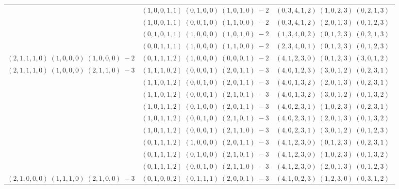 \documentclass[11pt]{article}
\begin{document}
\begin{longtable}[l]{|c|c|c|}
 \cline{2-3} 
 & $(1 ,0 ,0 ,1 ,1) \;(0 ,1 ,0 ,0) \;(1 ,0 ,1 ,0) \;-2$ & $(0 ,3 ,4 ,1 ,2) \;(1 ,0 ,2 ,3) \;(0 ,2 ,1 ,3) \;$\\ 
 \cline{2-3} 
 & $(1 ,0 ,0 ,1 ,1) \;(0 ,0 ,1 ,0) \;(1 ,1 ,0 ,0) \;-2$ & $(0 ,3 ,4 ,1 ,2) \;(2 ,0 ,1 ,3) \;(0 ,1 ,2 ,3) \;$\\ 
 \cline{2-3} 
 & $(0 ,1 ,0 ,1 ,1) \;(1 ,0 ,0 ,0) \;(1 ,0 ,1 ,0) \;-2$ & $(1 ,3 ,4 ,0 ,2) \;(0 ,1 ,2 ,3) \;(0 ,2 ,1 ,3) \;$\\ 
 \cline{2-3} 
 & $(0 ,0 ,1 ,1 ,1) \;(1 ,0 ,0 ,0) \;(1 ,1 ,0 ,0) \;-2$ & $(2 ,3 ,4 ,0 ,1) \;(0 ,1 ,2 ,3) \;(0 ,1 ,2 ,3) \;$\\ \hline\multirow[t]{1}{*}{ $(2 ,1 ,1 ,1 ,0) \;(1 ,0 ,0 ,0) \;(1 ,0 ,0 ,0) \;-2$ }  & $(0 ,1 ,1 ,1 ,2) \;(1 ,0 ,0 ,0) \;(0 ,0 ,0 ,1) \;-2$ & $(4 ,1 ,2 ,3 ,0) \;(0 ,1 ,2 ,3) \;(3 ,0 ,1 ,2) \;$\\ \hline\multirow[t]{9}{*}{ $(2 ,1 ,1 ,1 ,0) \;(1 ,0 ,0 ,0) \;(2 ,1 ,1 ,0) \;-3$ }  & $(1 ,1 ,1 ,0 ,2) \;(0 ,0 ,0 ,1) \;(2 ,0 ,1 ,1) \;-3$ & $(4 ,0 ,1 ,2 ,3) \;(3 ,0 ,1 ,2) \;(0 ,2 ,3 ,1) \;$\\ 
 \cline{2-3} 
 & $(1 ,1 ,0 ,1 ,2) \;(0 ,0 ,1 ,0) \;(2 ,0 ,1 ,1) \;-3$ & $(4 ,0 ,1 ,3 ,2) \;(2 ,0 ,1 ,3) \;(0 ,2 ,3 ,1) \;$\\ 
 \cline{2-3} 
 & $(1 ,1 ,0 ,1 ,2) \;(0 ,0 ,0 ,1) \;(2 ,1 ,0 ,1) \;-3$ & $(4 ,0 ,1 ,3 ,2) \;(3 ,0 ,1 ,2) \;(0 ,1 ,3 ,2) \;$\\ 
 \cline{2-3} 
 & $(1 ,0 ,1 ,1 ,2) \;(0 ,1 ,0 ,0) \;(2 ,0 ,1 ,1) \;-3$ & $(4 ,0 ,2 ,3 ,1) \;(1 ,0 ,2 ,3) \;(0 ,2 ,3 ,1) \;$\\ 
 \cline{2-3} 
 & $(1 ,0 ,1 ,1 ,2) \;(0 ,0 ,1 ,0) \;(2 ,1 ,0 ,1) \;-3$ & $(4 ,0 ,2 ,3 ,1) \;(2 ,0 ,1 ,3) \;(0 ,1 ,3 ,2) \;$\\ 
 \cline{2-3} 
 & $(1 ,0 ,1 ,1 ,2) \;(0 ,0 ,0 ,1) \;(2 ,1 ,1 ,0) \;-3$ & $(4 ,0 ,2 ,3 ,1) \;(3 ,0 ,1 ,2) \;(0 ,1 ,2 ,3) \;$\\ 
 \cline{2-3} 
 & $(0 ,1 ,1 ,1 ,2) \;(1 ,0 ,0 ,0) \;(2 ,0 ,1 ,1) \;-3$ & $(4 ,1 ,2 ,3 ,0) \;(0 ,1 ,2 ,3) \;(0 ,2 ,3 ,1) \;$\\ 
 \cline{2-3} 
 & $(0 ,1 ,1 ,1 ,2) \;(0 ,1 ,0 ,0) \;(2 ,1 ,0 ,1) \;-3$ & $(4 ,1 ,2 ,3 ,0) \;(1 ,0 ,2 ,3) \;(0 ,1 ,3 ,2) \;$\\ 
 \cline{2-3} 
 & $(0 ,1 ,1 ,1 ,2) \;(0 ,0 ,1 ,0) \;(2 ,1 ,1 ,0) \;-3$ & $(4 ,1 ,2 ,3 ,0) \;(2 ,0 ,1 ,3) \;(0 ,1 ,2 ,3) \;$\\ \hline\multirow[t]{6}{*}{ $(2 ,1 ,0 ,0 ,0) \;(1 ,1 ,1 ,0) \;(2 ,1 ,0 ,0) \;-3$ }  & $(0 ,1 ,0 ,0 ,2) \;(0 ,1 ,1 ,1) \;(2 ,0 ,0 ,1) \;-3$ & $(4 ,1 ,0 ,2 ,3) \;(1 ,2 ,3 ,0) \;(0 ,3 ,1 ,2) \;$\\ 

\end{longtable}
\end{document}
